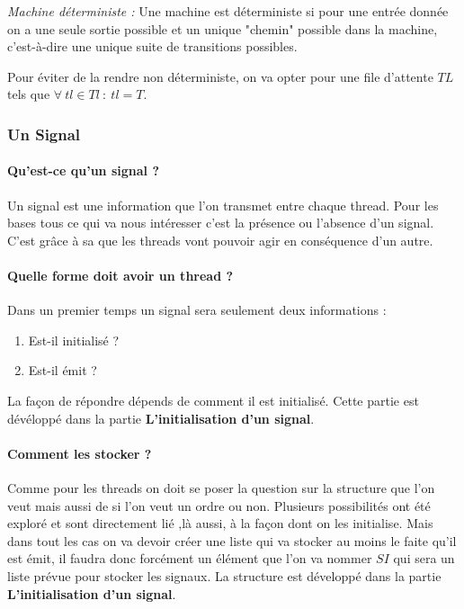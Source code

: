 \documentclass[10pt,a4paper]{article}
\begin{document}
				\textit{Machine déterministe :} Une machine est déterministe si pour une entrée donnée on a une seule sortie possible et un unique "chemin" possible dans la machine, c'est-à-dire une unique suite de transitions possibles.
				\medbreak
					
				Pour éviter de la rendre non déterministe, on va opter pour une file d'attente $TL$ tels que $\forall~tl \in Tl~:~tl = T$.
				\bigbreak
					
			\subsubsection{Un Signal} 
				
				\paragraph{Qu'est-ce qu'un signal ?}
				Un signal est une information que l'on transmet entre chaque thread. Pour les bases tous ce qui va nous intéresser c'est la présence ou l'absence d'un signal. C'est grâce à sa que les threads vont pouvoir agir en conséquence d'un autre. 
					
				\paragraph{Quelle forme doit avoir un thread ?} 
				Dans un premier temps un signal sera seulement deux informations : 
				\begin{enumerate}
					\item Est-il initialisé ?
					\item Est-il émit ?
				\end{enumerate}
				La façon de répondre dépends de comment il est initialisé. Cette partie est dévéloppé dans la partie \textbf{L'initialisation d'un signal}.
					
				\paragraph{Comment les stocker ?}
				Comme pour les threads on doit se poser la question sur la structure que l'on veut mais aussi de si l'on veut un ordre ou non. Plusieurs possibilités ont été exploré et sont directement lié ,là aussi, à la façon dont on les initialise. Mais dans tout les cas on va devoir créer une liste qui va stocker au moins le faite qu'il est émit, il faudra donc forcément un élément que l'on va nommer $SI$ qui sera un liste prévue pour stocker les signaux. La structure est développé dans la partie \textbf{L'initialisation d'un signal}.
				\bigbreak 
			
\end{document}
